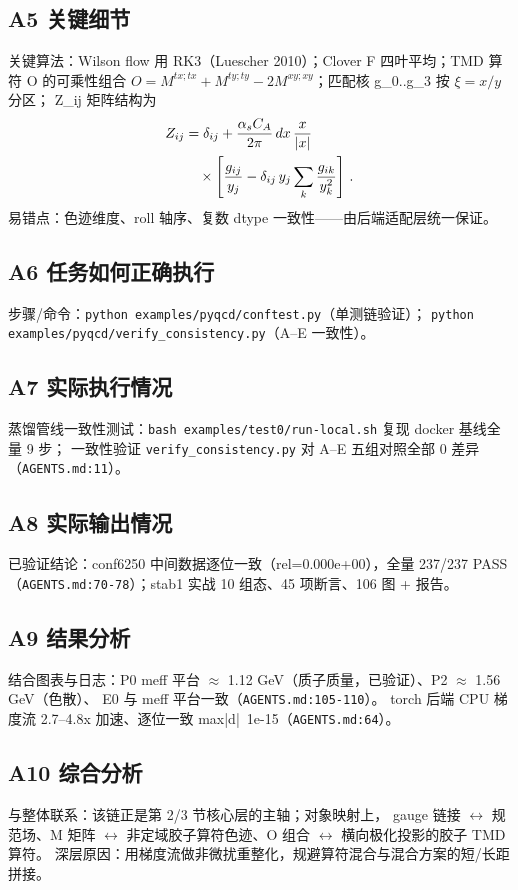 \documentclass[UTF8]{ctexart}
\begin{document}
\subsection{A5 关键细节}
关键算法：Wilson flow 用 RK3（Luescher 2010）；Clover F 四叶平均；TMD 算符 O 的可乘性组合
$O = M^{tx;tx} + M^{ty;ty} - 2M^{xy;xy}$；匹配核 g\_0..g\_3 按 $\xi=x/y$ 分区；
Z\_ij 矩阵结构为
\begin{align}
Z_{ij} &= \delta_{ij} + \frac{\alpha_s C_A}{2\pi}\,dx\,\frac{x}{|x|} \notag\\
&\quad\times\left[\frac{g_{ij}}{y_j} - \delta_{ij}\,y_j\sum_k \frac{g_{ik}}{y_k^2}\right]\,.
\end{align}
易错点：色迹维度、roll 轴序、复数 dtype 一致性——由后端适配层统一保证。

\subsection{A6 任务如何正确执行}
步骤/命令：\textcolor{evidence}{\nolinkurl{python examples/pyqcd/conftest.py}}（单测链验证）；
\textcolor{evidence}{\nolinkurl{python examples/pyqcd/verify_consistency.py}}（A–E 一致性）。

\subsection{A7 实际执行情况}
蒸馏管线一致性测试：\nolinkurl{bash examples/test0/run-local.sh} 复现 docker 基线全量 9 步；
一致性验证 \nolinkurl{verify\_consistency.py} 对 A–E 五组对照全部 0 差异（\textcolor{evidence}{\nolinkurl{AGENTS.md:11}}）。

\subsection{A8 实际输出情况}
已验证结论：conf6250 中间数据逐位一致（rel=0.000e+00），全量 237/237 PASS
（\textcolor{evidence}{\nolinkurl{AGENTS.md:70-78}}）；stab1 实战 10 组态、45 项断言、106 图 + 报告。

\subsection{A9 结果分析}
结合图表与日志：P0 meff 平台 $\approx$ 1.12 GeV（质子质量，已验证）、P2 $\approx$ 1.56 GeV（色散）、
E0 与 meff 平台一致（\textcolor{evidence}{\nolinkurl{AGENTS.md:105-110}}）。
torch 后端 CPU 梯度流 2.7–4.8x 加速、逐位一致 max|d|~1e-15（\textcolor{evidence}{\nolinkurl{AGENTS.md:64}}）。

\subsection{A10 综合分析}
与整体联系：该链正是第 2/3 节核心层的主轴；对象映射上，
gauge 链接 $\leftrightarrow$ 规范场、M 矩阵 $\leftrightarrow$ 非定域胶子算符色迹、O 组合 $\leftrightarrow$ 横向极化投影的胶子 TMD 算符。
深层原因：用梯度流做非微扰重整化，规避算符混合与混合方案的短/长距拼接。
\end{document}
